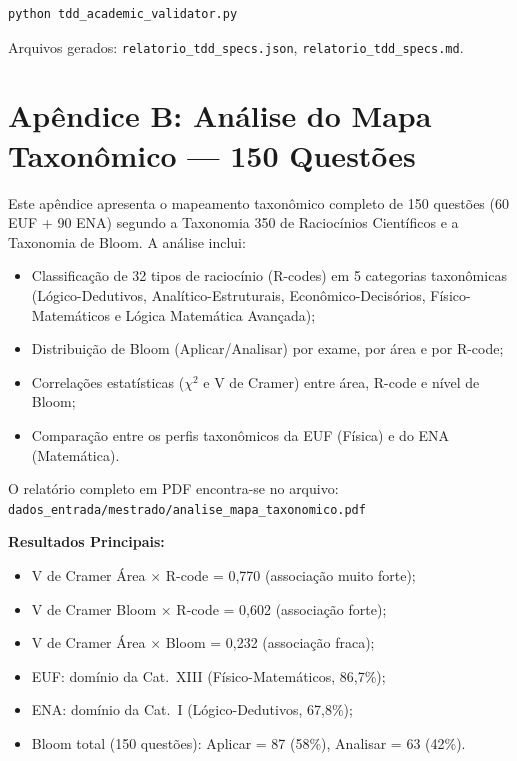 \documentclass[
  brazilian,
  12pt,
]{article}
\begin{document}
\begin{verbatim}
python tdd_academic_validator.py
\end{verbatim}

Arquivos gerados: \texttt{relatorio\_tdd\_specs.json}, \texttt{relatorio\_tdd\_specs.md}.


\newpage
\section*{Apêndice B: Análise do Mapa Taxonômico --- 150 Questões}

Este apêndice apresenta o mapeamento taxonômico completo de 150 questões
(60 EUF + 90 ENA) segundo a Taxonomia 350 de Raciocínios Científicos e a
Taxonomia de Bloom. A análise inclui:
\begin{itemize}
  \item Classificação de 32 tipos de raciocínio (R-codes) em 5 categorias
    taxonômicas (Lógico-Dedutivos, Analítico-Estruturais,
    Econômico-Decisórios, Físico-Matemáticos e Lógica Matemática
    Avançada);
  \item Distribuição de Bloom (Aplicar/Analisar) por exame, por área
    e por R-code;
  \item Correlações estatísticas ($\chi^2$ e V de Cramer) entre área,
    R-code e nível de Bloom;
  \item Comparação entre os perfis taxonômicos da EUF (Física) e do
    ENA (Matemática).
\end{itemize}

O relatório completo em PDF encontra-se no arquivo:
\texttt{dados\_entrada/mestrado/analise\_mapa\_taxonomico.pdf}

\vspace{0.3cm}
\noindent\textbf{Resultados Principais:}
\begin{itemize}
  \item V de Cramer Área $\times$ R-code = 0,770 (associação muito forte);
  \item V de Cramer Bloom $\times$ R-code = 0,602 (associação forte);
  \item V de Cramer Área $\times$ Bloom = 0,232 (associação fraca);
  \item EUF: domínio da Cat.~XIII (Físico-Matemáticos, 86,7\%);
  \item ENA: domínio da Cat.~I (Lógico-Dedutivos, 67,8\%);
  \item Bloom total (150 questões): Aplicar = 87 (58\%), Analisar = 63 (42\%).
\end{itemize}
\end{document}
